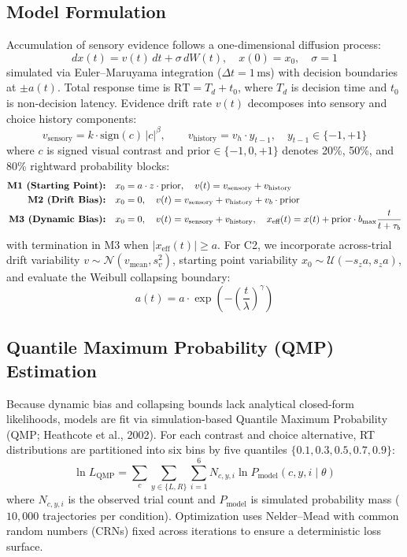 \documentclass[10pt,a4paper]{article}
\begin{document}
\subsection{Model Formulation}
Accumulation of sensory evidence follows a one-dimensional diffusion process:
\begin{equation}
dx(t) = v(t)\,dt + \sigma\,dW(t), \quad x(0) = x_0, \quad \sigma = 1
\end{equation}
simulated via Euler--Maruyama integration ($\Delta t = 1\,\text{ms}$) with decision boundaries at $\pm a(t)$. Total response time is $\text{RT} = T_d + t_0$, where $T_d$ is decision time and $t_0$ is non-decision latency. Evidence drift rate $v(t)$ decomposes into sensory and choice history components:
\begin{equation}
v_{\text{sensory}} = k \cdot \text{sign}(c)\,|c|^\beta, \qquad v_{\text{history}} = v_h \cdot y_{t-1}, \quad y_{t-1} \in \{-1, +1\}
\end{equation}
where $c$ is signed visual contrast and $\text{prior} \in \{-1, 0, +1\}$ denotes 20\%, 50\%, and 80\% rightward probability blocks:
\begin{align}
\text{\textbf{M1 (Starting Point):}} \quad & x_0 = a \cdot z \cdot \text{prior}, \quad v(t) = v_{\text{sensory}} + v_{\text{history}} \\
\text{\textbf{M2 (Drift Bias):}} \quad & x_0 = 0, \quad v(t) = v_{\text{sensory}} + v_{\text{history}} + v_b \cdot \text{prior} \\
\text{\textbf{M3 (Dynamic Bias):}} \quad & x_0 = 0, \quad v(t) = v_{\text{sensory}} + v_{\text{history}}, \quad x_{\text{eff}}(t) = x(t) + \text{prior} \cdot b_{\max} \frac{t}{t + \tau_b}
\end{align}
with termination in M3 when $|x_{\text{eff}}(t)| \ge a$. For C2, we incorporate across-trial drift variability $v \sim \mathcal{N}(v_{\text{mean}}, s_v^2)$, starting point variability $x_0 \sim \mathcal{U}(-s_z a, s_z a)$, and evaluate the Weibull collapsing boundary:
\begin{equation}
a(t) = a \cdot \exp\left(-\left(\frac{t}{\lambda}\right)^\gamma\right)
\end{equation}

\subsection{Quantile Maximum Probability (QMP) Estimation}
Because dynamic bias and collapsing bounds lack analytical closed-form likelihoods, models are fit via simulation-based Quantile Maximum Probability (QMP; Heathcote et al., 2002). For each contrast and choice alternative, RT distributions are partitioned into six bins by five quantiles $\{0.1, 0.3, 0.5, 0.7, 0.9\}$:
\begin{equation}
\ln L_{\text{QMP}} = \sum_{c} \sum_{y \in \{L, R\}} \sum_{i=1}^{6} N_{c, y, i} \ln P_{\text{model}}(c, y, i \mid \theta)
\end{equation}
where $N_{c, y, i}$ is the observed trial count and $P_{\text{model}}$ is simulated probability mass ($10{,}000$ trajectories per condition). Optimization uses Nelder--Mead with common random numbers (CRNs) fixed across iterations to ensure a deterministic loss surface.
\end{document}
